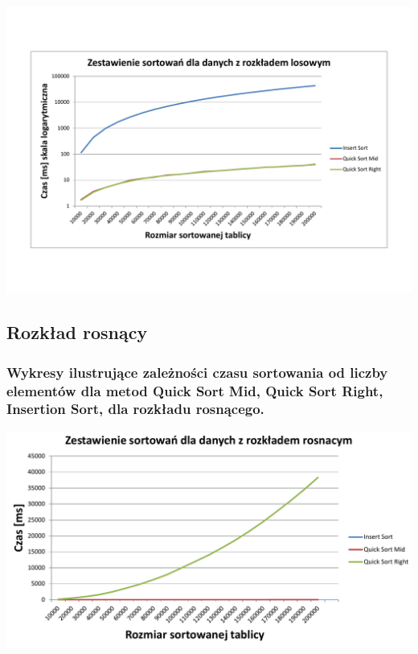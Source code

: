 \documentclass[polish,polish,a4paper]{article}
\begin{document}
\begin{spacing}{1.5}
\begin{minipage}[H]{\textwidth}
	\begin{center}
		\includegraphics[scale=0.55]{zad3losowylog.pdf}
		\label{fig:zad3loslog}
	\end{center}
\end{minipage}


\subsection{Rozkład rosnący}

\subsubsection*{Wykresy ilustrujące zależności czasu sortowania od liczby elementów dla metod Quick Sort Mid, Quick Sort Right, Insertion Sort, dla rozkładu rosnącego.}


	

\begin{minipage}[H]{\textwidth}
	\begin{center}
		\includegraphics[scale=0.6]{zad3rosnacynorm.pdf}
		\label{fig:zad3rosn}
	\end{center}
\end{minipage}\\[1cm]




\end{spacing}
\end{document}
